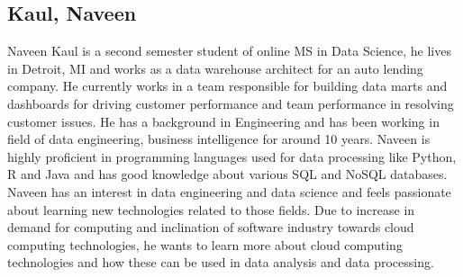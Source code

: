 \subsection{Kaul, Naveen}

Naveen Kaul is a second semester student of online MS in Data Science, he lives
in Detroit, MI and works as a data warehouse architect for an auto lending
company. He currently works in a team responsible for building data marts and
dashboards for driving customer performance and team performance in resolving
customer issues. He has a background in Engineering and has been working in
field of data engineering, business intelligence for around 10 years. Naveen is
highly proficient in programming languages used for data processing like Python,
R and Java and has good knowledge about various SQL and NoSQL databases. Naveen
has an interest in data engineering and data science and feels passionate about
learning new technologies related to those fields. Due to increase in demand for
computing and inclination of software industry towards cloud computing
technologies, he wants to learn more about cloud computing technologies and how
these can be used in data analysis and data processing.
